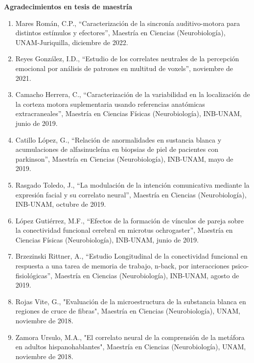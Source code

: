 \documentclass[11pt]{article}
\begin{document}
\textbf{\color{red}Agradecimientos en tesis de maestría}

\begin{enumerate}
\item Mares Román, C.P., “Caracterización de la sincronía auditivo-motora para distintos estímulos y efectores”, Maestría en Ciencias (Neurobiología), 
UNAM-Juriquilla,   diciembre de 2022.

\item Reyes González, I.D., “Estudio de los correlates neutrales de la percepción emocional por análisis de patrones en multitud de voxels”,   noviembre de 
2021.

\item Camacho Herrera, C., “Caracterización de la variabilidad en la localización de la corteza motora suplementaria usando referencias anatómicas 
extracraneales”, Maestría en Ciencias Físicas (Neurobiología), INB-UNAM,   junio de 2019.

\item Catillo López, G., “Relación de anormalidades en sustancia blanca y acumulaciones de alfasinucleína en biopsias de piel de pacientes con parkinson”, 
Maestría en Ciencias (Neurobiología), INB-UNAM,   mayo de 2019.

\item Rasgado Toledo, J., “La modulación de la intención comunicativa mediante la expresión facial y su correlato neural”, Maestría en Ciencias 
(Neurobiología), 
INB-UNAM,   octubre de 2019.

\item López Gutiérrez, M.F., “Efectos de la formación de vínculos de pareja sobre la conectividad funcional cerebral en microtus ochrogaster”, Maestría en 
Ciencias Físicas (Neurobiología), INB-UNAM,   junio de 2019.

\item Brzezinski Rittner, A., “Estudio Longitudinal de la conectividad funcional en respuesta a una tarea de memoria de trabajo, n-back, por interacciones 
psico-fisiológicas”, Maestría en Ciencias (Neurobiología), INB-UNAM,   agosto de 2019.

\item Rojas Vite, G., "Evaluación de la microestructura de la substancia blanca en regiones de cruce de fibras", Maestría en Ciencias (Neurobiología), UNAM,   
noviembre de 2018.

\item Zamora Ursulo, M.A., "El correlato neural de la comprensión de la metáfora en adultos hispanohablantes", Maestría en Ciencias (Neurobiología), UNAM,   
noviembre de 2018.


\end{enumerate}
\end{document}
